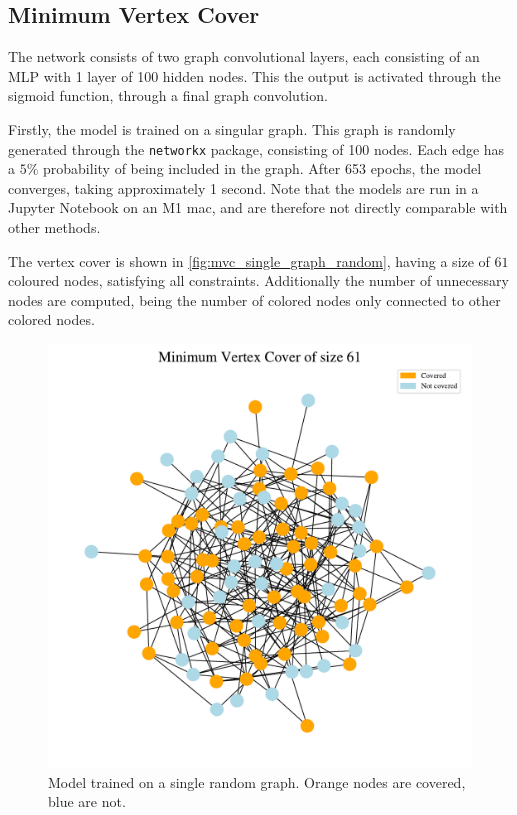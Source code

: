 \subsection{Minimum Vertex Cover}
The network consists of two graph convolutional layers, each consisting of an MLP with 1 layer of 100 hidden nodes.
This the output is activated through the sigmoid function, through a final graph convolution.

Firstly, the model is trained on a singular graph.
This graph is randomly generated through the \verb|networkx| package, consisting of 100 nodes.
Each edge has a $5\%$ probability of being included in the graph.
After 653 epochs, the model converges, taking approximately 1 second.
Note that the models are run in a Jupyter Notebook on an M1 mac, and are therefore not directly comparable with other methods.

The vertex cover is shown in \autoref{fig:mvc_single_graph_random}, having a size of $61$ coloured nodes, satisfying all constraints.
Additionally the number of unnecessary nodes are computed, being the number of colored nodes only connected to other colored nodes.

\begin{figure}[h]
    \centering
    \includegraphics[width=\linewidth]{Project2TSP/_src/figures/mvc_graph_single.pdf}
    \caption{Model trained on a single random graph. Orange nodes are covered, blue are not.}
    \label{fig:mvc_single_graph_random}
\end{figure}

